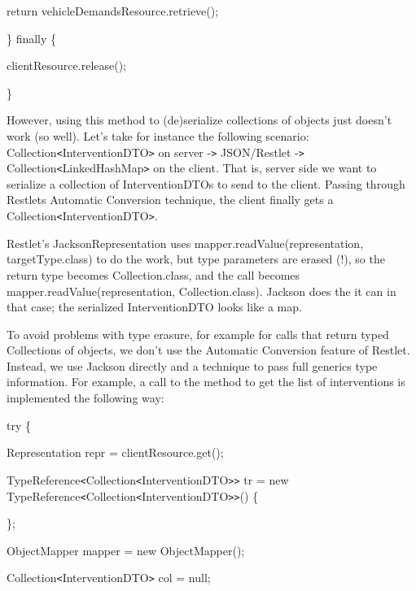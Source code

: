 \documentclass{article}
\begin{document}
{\color{color01} return  vehicleDemandsResource.retrieve();}

{\color{color01} \} finally \{}

{\color{color01} clientResource.release();}

{\color{color01} \}}

\vspace{13pt}
{\color{color01} However, using this method to (de)serialize collections of objects 
just doesn't work (so well). Let's take for instance the following scenario: Collection\texttt{<}InterventionDTO\texttt{>} 
on server -\texttt{>} JSON/Restlet -\texttt{>} Collection\texttt{<}LinkedHashMap\texttt{>} 
on the client. That is, server side we want to serialize a collection of InterventionDTOs 
to send to the client. Passing through Restlets Automatic Conversion technique, 
the client finally gets a Collection\texttt{<}InterventionDTO\texttt{>}.}

\vspace{13pt}
{\color{color01} Restlet's JacksonRepresentation uses mapper.readValue(representation, 
targetType.class) to do the work, but type parameters are erased (!), so the return 
type becomes Collection.class, and the call becomes mapper.readValue(representation, 
Collection.class). Jackson does the it can in that case; the serialized InterventionDTO 
looks like a map.}

\vspace{13pt}
{\color{color01} To avoid problems with type erasure, for example for calls that 
return typed Collections of objects, we don't use the Automatic Conversion feature 
of Restlet. Instead, we use Jackson directly and a technique to pass full generics 
type information. For example, a call to the method to get the list of interventions 
is implemented the following way:}

\vspace{13pt}
{\color{color01} try \{}

{\color{color01} Representation repr = clientResource.get();}

\vspace{13pt}
{\color{color01} TypeReference\texttt{<}Collection\texttt{<}InterventionDTO\texttt{>}\texttt{>} 
tr = new TypeReference\texttt{<}Collection\texttt{<}InterventionDTO\texttt{>}\texttt{>}() 
\{}

\parindent=54pt
{\color{color01} \};}

\parindent=0pt
{\color{color01} ObjectMapper mapper = new ObjectMapper();}

{\color{color01} Collection\texttt{<}InterventionDTO\texttt{>} col = null;}
\end{document}
